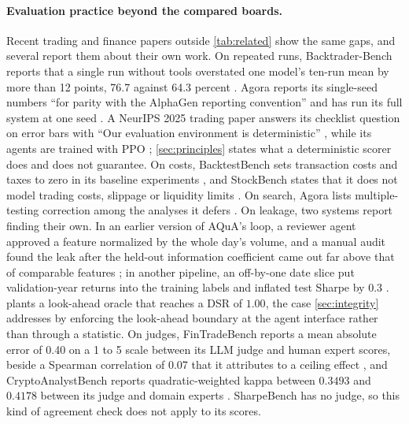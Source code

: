 \paragraph{Evaluation practice beyond the compared boards.} Recent trading and finance papers outside \cref{tab:related} show the same gaps, and several report them about their own work. On repeated runs, Backtrader-Bench reports that a single run without tools overstated one model's ten-run mean by more than 12 points, 76.7 against 64.3 percent \citep[p.~4]{zhao2026backtrader}. Agora reports its single-seed numbers ``for parity with the AlphaGen reporting convention'' \citep[p.~15]{li2026agora} and has run its full system at one seed \citep[pp.~15 and 33]{li2026agora}. A NeurIPS 2025 trading paper answers its checklist question on error bars with ``Our evaluation environment is deterministic'' \citep[p.~17]{ma2025robust}, while its agents are trained with PPO \citep[p.~39]{ma2025robust}; \cref{sec:principles} states what a deterministic scorer does and does not guarantee. On costs, BacktestBench sets transaction costs and taxes to zero in its baseline experiments \citep[p.~3]{wang2026backtestbench}, and StockBench states that it does not model trading costs, slippage or liquidity limits \citep[arXiv version 2, p.~9]{stockbench2025}. On search, Agora lists multiple-testing correction among the analyses it defers \citep[p.~34]{li2026agora}. On leakage, two systems report finding their own. In an earlier version of AQuA's loop, a reviewer agent approved a feature normalized by the whole day's volume, and a manual audit found the leak after the held-out information coefficient came out far above that of comparable features \citep[pp.~21--22]{guo2026aqua}; in another pipeline, an off-by-one date slice put validation-year returns into the training labels and inflated test Sharpe by 0.3 \citep[p.~11]{du2026multifactor}.  plants a look-ahead oracle that reaches a DSR of $1.00$, the case \cref{sec:integrity} addresses by enforcing the look-ahead boundary at the agent interface rather than through a statistic. On judges, FinTradeBench reports a mean absolute error of 0.40 on a 1 to 5 scale between its LLM judge and human expert scores, beside a Spearman correlation of 0.07 that it attributes to a ceiling effect \citep[p.~25]{agrawal2026fintradebench}, and CryptoAnalystBench reports quadratic-weighted kappa between $0.3493$ and $0.4178$ between its judge and domain experts \citep[p.~8]{eswaran2026cryptoanalyst}. SharpeBench has no judge, so this kind of agreement check does not apply to its scores.

